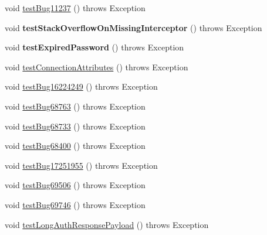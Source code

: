 \begin{DoxyCompactItemize}
\item 
void \mbox{\hyperlink{classtestsuite_1_1regression_1_1_connection_regression_test_a93fc4be2d20938ec5b54e34d3c2eb25c}{test\+Bug11237}} ()  throws Exception 
\item 
\mbox{\label{classtestsuite_1_1regression_1_1_connection_regression_test_ae8df976277a98a5f56b0fc591a4f6103}} 
void {\bfseries test\+Stack\+Overflow\+On\+Missing\+Interceptor} ()  throws Exception 
\item 
\mbox{\label{classtestsuite_1_1regression_1_1_connection_regression_test_a8e581b7d593b06e2deca5f2498c3de72}} 
void {\bfseries test\+Expired\+Password} ()  throws Exception 
\item 
void \mbox{\hyperlink{classtestsuite_1_1regression_1_1_connection_regression_test_ab031515e8ccff3b5b929eccb92f9ca64}{test\+Connection\+Attributes}} ()  throws Exception 
\item 
void \mbox{\hyperlink{classtestsuite_1_1regression_1_1_connection_regression_test_a24c8f315d33aa8259b7777c43e225b24}{test\+Bug16224249}} ()  throws Exception 
\item 
void \mbox{\hyperlink{classtestsuite_1_1regression_1_1_connection_regression_test_ad20cb3d4d184371c5cbf7e540726e6a6}{test\+Bug68763}} ()  throws Exception 
\item 
void \mbox{\hyperlink{classtestsuite_1_1regression_1_1_connection_regression_test_a9d54ba5c540e24424893bc15c83312ac}{test\+Bug68733}} ()  throws Exception 
\item 
void \mbox{\hyperlink{classtestsuite_1_1regression_1_1_connection_regression_test_a51c24689dc4bef4ba615be9fc98cf30a}{test\+Bug68400}} ()  throws Exception 
\item 
void \mbox{\hyperlink{classtestsuite_1_1regression_1_1_connection_regression_test_ad677d873884570b76279a42c590dbe5b}{test\+Bug17251955}} ()  throws Exception 
\item 
void \mbox{\hyperlink{classtestsuite_1_1regression_1_1_connection_regression_test_ac8bd9a129a96fb8c9d9c220369e1a5b2}{test\+Bug69506}} ()  throws Exception 
\item 
void \mbox{\hyperlink{classtestsuite_1_1regression_1_1_connection_regression_test_adeeac09d039c69e054e676529af26ca7}{test\+Bug69746}} ()  throws Exception 
\item 
void \mbox{\hyperlink{classtestsuite_1_1regression_1_1_connection_regression_test_a1f2f79b3fda5cc037b1fa079164289a5}{test\+Long\+Auth\+Response\+Payload}} ()  throws Exception 

\end{DoxyCompactItemize}
